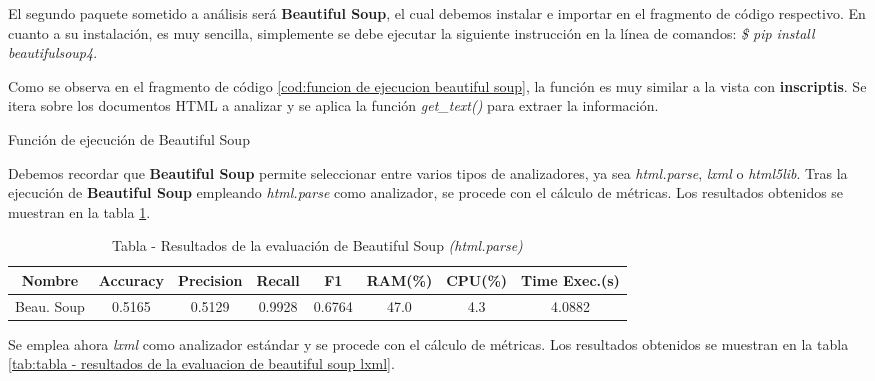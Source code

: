 El segundo paquete sometido a análisis será \textbf{Beautiful Soup}, el cual debemos instalar e importar 
en el fragmento de código respectivo. En cuanto a su instalación, es muy sencilla, simplemente se debe 
ejecutar la siguiente instrucción en la línea de comandos: \emph{\$ pip install beautifulsoup4}.

Como se observa en el fragmento de código \ref{cod:funcion de ejecucion beautiful soup}, la función es muy
similar a la vista con \textbf{inscriptis}. Se itera sobre los documentos HTML a analizar y se aplica la
función \emph{get\_text()} para extraer la información.

\begin{codefloat}
    
    \caption{Función de ejecución de Beautiful Soup}
    \label{cod:funcion de ejecucion beautiful soup}
\end{codefloat}

Debemos recordar que \textbf{Beautiful Soup} permite seleccionar entre varios tipos de analizadores, ya sea
\emph{html.parse}, \emph{lxml} o \emph{html5lib}. Tras la ejecución de \textbf{Beautiful Soup} empleando
\emph{html.parse} como analizador, se procede con el cálculo de métricas. Los resultados obtenidos se 
muestran en la tabla \ref{tab:tabla - resultados de la evaluacion de beautiful soup html.parse}.

\begin{table}[h]
    \begin{center}
      \begin{tabular}{| c | c | c | c | c | c | c | c |} \hline 
       \textbf{Nombre} & \textbf{Accuracy} & \textbf{Precision}  & \textbf{Recall} & \textbf{F1} & \textbf{RAM(\%)} & \textbf{CPU(\%)} & \textbf{Time Exec.(s)} \\ \hline
       Beau. Soup & 0.5165 & 0.5129 & 0.9928 & 0.6764 & 47.0 & 4.3 & 4.0882 \\ \hline
      \end{tabular}
      \caption{Tabla - Resultados de la evaluación de Beautiful Soup \emph{(html.parse)}}
      \label{tab:tabla - resultados de la evaluacion de beautiful soup html.parse}
    \end{center}
\end{table} 

Se emplea ahora \emph{lxml} como analizador estándar y se procede con el cálculo de métricas. Los resultados
obtenidos se muestran en la tabla \ref{tab:tabla - resultados de la evaluacion de beautiful soup lxml}.


